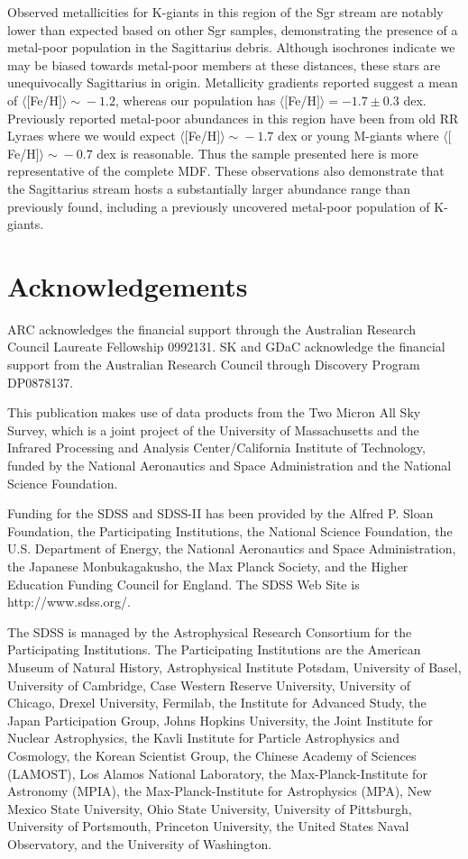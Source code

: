 \documentclass[preprint2]{aastex}
\begin{document}
	Observed metallicities for K-giants in this region of the Sgr stream are notably lower than expected based on other Sgr samples, demonstrating the presence of a metal-poor population in the  Sagittarius debris. Although isochrones indicate we may be biased towards metal-poor members at these distances, these stars are unequivocally Sagittarius in origin. Metallicity gradients reported suggest a mean of $\langle[$Fe/H$]\rangle\sim{}-1.2$, whereas our population has $\langle[$Fe/H$]\rangle = -1.7 \pm 0.3$ dex. Previously reported metal-poor abundances in this region have been from old RR Lyraes where we would expect $\langle[$Fe/H$]\rangle\sim{}-1.7$ dex or young M-giants where $\langle[$Fe/H$]\rangle\sim{}-0.7$ dex is reasonable. Thus the sample presented here is more representative of the complete MDF. These observations also demonstrate that the Sagittarius stream hosts a substantially larger abundance range than previously found, including a previously uncovered metal-poor population of K-giants.
	
\section{Acknowledgements}
ARC acknowledges the financial support through the Australian Research Council Laureate Fellowship 0992131. SK and GDaC acknowledge the financial support from the Australian Research Council through Discovery Program DP0878137.

This publication makes use of data products from the Two Micron All Sky Survey, which is a joint project of the University of Massachusetts and the Infrared Processing and Analysis Center/California Institute of Technology, funded by the National Aeronautics and Space Administration and the National Science Foundation.

Funding for the SDSS and SDSS-II has been provided by the Alfred P. Sloan Foundation, the Participating Institutions, the National Science Foundation, the U.S. Department of Energy, the National Aeronautics and Space Administration, the Japanese Monbukagakusho, the Max Planck Society, and the Higher Education Funding Council for England. The SDSS Web Site is http://www.sdss.org/.

The SDSS is managed by the Astrophysical Research Consortium for the Participating Institutions. The Participating Institutions are the American Museum of Natural History, Astrophysical Institute Potsdam, University of Basel, University of Cambridge, Case Western Reserve University, University of Chicago, Drexel University, Fermilab, the Institute for Advanced Study, the Japan Participation Group, Johns Hopkins University, the Joint Institute for Nuclear Astrophysics, the Kavli Institute for Particle Astrophysics and Cosmology, the Korean Scientist Group, the Chinese Academy of Sciences (LAMOST), Los Alamos National Laboratory, the Max-Planck-Institute for Astronomy (MPIA), the Max-Planck-Institute for Astrophysics (MPA), New Mexico State University, Ohio State University, University of Pittsburgh, University of Portsmouth, Princeton University, the United States Naval Observatory, and the University of Washington.


	
\end{document}
